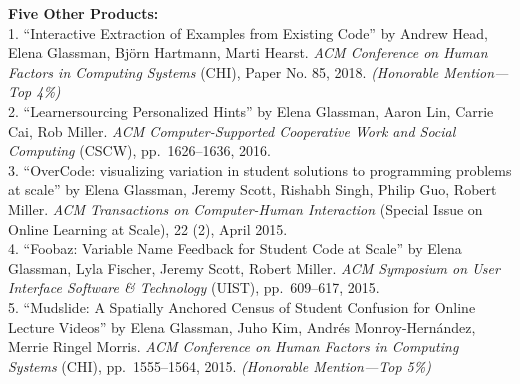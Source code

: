 \documentclass[11pt]{article}
\begin{document}
{\bf Five Other Products:}\\
1. ``Interactive Extraction of Examples from Existing Code'' by Andrew Head, Elena Glassman, Bj\"orn Hartmann, Marti Hearst. \emph{ACM Conference on Human Factors in Computing Systems} (CHI), Paper No. 85, 2018. {\em (Honorable Mention---Top 4\%)}\\[2pt]
2. ``Learnersourcing Personalized Hints'' by Elena Glassman, Aaron Lin, Carrie Cai, Rob Miller. \emph{ACM Computer-Supported Cooperative Work and Social Computing} (CSCW), pp.~1626--1636, 2016.\\[2pt]
3. ``OverCode: visualizing variation in student solutions to programming problems at scale'' by Elena Glassman, Jeremy Scott, Rishabh Singh, Philip Guo, Robert Miller. \emph{ACM Transactions on Computer-Human Interaction} ({\small Special Issue on Online Learning at Scale}), 22 (2), April 2015.\\[2pt]
4. ``Foobaz: Variable Name Feedback for Student Code at Scale'' by Elena Glassman, Lyla Fischer, Jeremy Scott, Robert Miller. \emph{ACM Symposium on User Interface Software \& Technology} (UIST), pp.~609--617, 2015.\\[2pt]
5. ``Mudslide: A Spatially Anchored Census of Student Confusion for Online Lecture Videos'' by Elena Glassman, Juho Kim, Andr\'es Monroy-Hern\'andez, Merrie Ringel Morris. \emph{ACM Conference on Human Factors in Computing Systems} (CHI), pp.~1555--1564, 2015. {\em (Honorable Mention---Top 5\%)}\\[2pt]
\end{document}
